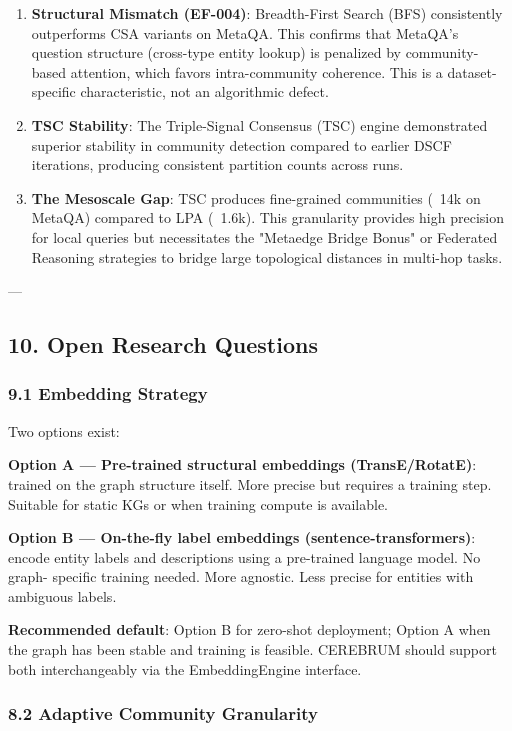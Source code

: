 \documentclass[10pt,journal,compsoc]{IEEEtran}
\begin{document}
\begin{enumerate}
\item \textbf{Structural Mismatch (EF-004)}: Breadth-First Search (BFS) consi\-stently outperforms CSA variants on MetaQA. This confirms that MetaQA's question structure (cross-type entity lookup) is penalized by community-based attention, which favors intra-community coherence. This is a dataset-specific chara\-cteristic, not an algorithmic defect.
\item \textbf{TSC Stability}: The Triple-Signal Consensus (TSC) engine demon\-strated superior stability in community detection compared to earlier DSCF iterations, producing consistent partition counts across runs.
\item \textbf{The Mesoscale Gap}: TSC produces fine-grained communities (~14k on MetaQA) compared to LPA (~1.6k). This granularity provides high precision for local queries but neces\-sitates the "Metaedge Bridge Bonus" or Federated Reasoning strategies to bridge large topological distances in multi-hop tasks.

\end{enumerate}
---

\subsection{10. Open Research Questions}

\subsubsection{9.1 Embedding Strategy}

Two options exist:

\textbf{Option A — Pre-trained structural embeddings (TransE/RotatE)}: trained
on the graph structure itself. More precise but requires a training step.
Suitable for static KGs or when training compute is available.

\textbf{Option B — On-the-fly label embeddings (sentence-trans\-formers)}: encode
entity labels and descr\-iptions using a pre-trained language model. No graph-
specific training needed. More agnostic. Less precise for entities with
ambiguous labels.

\textbf{Recommended default}: Option B for zero-shot deployment; Option A when the
graph has been stable and training is feasible. CEREBRUM should support both
inter\-changeably via the EmbeddingEngine interface.

\subsubsection{8.2 Adaptive Community Granularity}
\end{document}
